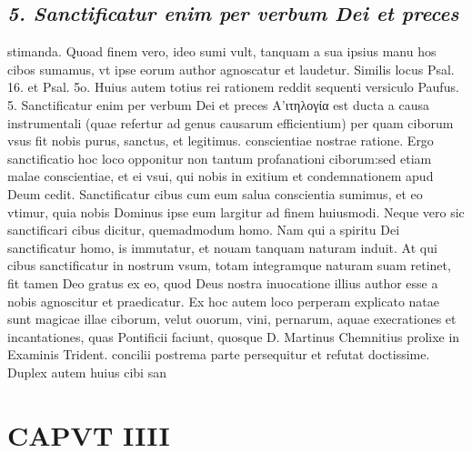 \documentclass{article}
\begin{document}
\begin{pages}
\subsection*{\textit{5. Sanctificatur enim per verbum Dei et preces}}stimanda. Quoad finem vero, ideo sumi vult, tanquam a sua ipsius manu hos cibos sumamus, vt ipse eorum author agnoscatur et laudetur. Similis locus Psal. 16. et Psal. 5o. Huius autem totius rei rationem reddit sequenti versiculo Paufus. 5. Sanctificatur enim per verbum Dei et preces Α’ιτηλογία est ducta a causa instrumentali (quae refertur ad genus causarum efficientium) per quam ciborum vsus fit nobis purus, sanctus, et legitimus. conscientiae nostrae ratione. Ergo sanctificatio hoc loco opponitur non tantum profanationi ciborum:sed etiam malae conscientiae, et ei vsui, qui nobis in exitium et condemnationem apud Deum cedit. Sanctificatur cibus cum eum salua conscientia sumimus, et eo vtimur, quia nobis Dominus ipse eum largitur ad finem huiusmodi. Neque vero sic sanctificari cibus dicitur, quemadmodum homo. Nam qui a spiritu Dei sanctificatur homo, is immutatur, et nouam tanquam naturam induit. At qui cibus sanctificatur in nostrum vsum, totam integramque naturam suam retinet, fit tamen Deo gratus ex eo, quod Deus nostra inuocatione illius author esse a nobis agnoscitur et praedicatur. Ex hoc autem loco perperam explicato natae sunt magicae illae ciborum, velut ouorum, vini, pernarum, aquae execrationes et incantationes, quas Pontificii faciunt, quosque D. Martinus Chemnitius prolixe in Examinis Trident. concilii postrema parte persequitur et refutat doctissime. Duplex autem huius cibi san\pend
\section*{CAPVT  IIII }
\marginpar{[ p.19 ]}\pstart {}
{}

\end{pages}
\end{document}
